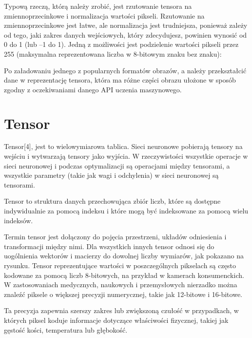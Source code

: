 \documentclass[brudnopis]{xmgr}
\begin{document}
Typową rzeczą, którą należy zrobić, jest rzutowanie tensora na zmiennoprzecinkowe i normalizacja wartości pikseli. Rzutowanie na zmiennoprzecinkowe jest łatwe, ale normalizacja jest trudniejsza, ponieważ zależy od tego, jaki zakres danych wejściowych, który zdecydujesz, powinien wynosić od 0 do 1 (lub –1 do 1). Jedną z możliwości jest podzielenie wartości pikseli przez 255 (maksymalna reprezentowana liczba w 8-bitowym znaku bez znaku):

Po załadowaniu jednego z popularnych formatów obrazów, a należy przekształcić dane w reprezentację tensora, która ma różne części obrazu ułożone w sposób zgodny z oczekiwaniami danego API uczenia maszynowego.

\section{Tensor\label{s:dsssl}}
Tensor[4], jest to wielowymiarowa tablica. Sieci neuronowe pobierają tensory na wejściu i wytwarzają tensory jako wyjścia. W rzeczywistości wszystkie operacje w sieci neuronowej i podczas optymalizacji są operacjami między tensorami, a wszystkie parametry (takie jak wagi i odchylenia) w sieci neuronowej są tensorami.

Tensor to struktura danych przechowująca zbiór liczb, które są dostępne indywidualnie za pomocą indeksu i które mogą być indeksowane za pomocą wielu indeksów.

Termin tensor jest dołączony do pojęcia przestrzeni, układów odniesienia i transformacji między nimi. Dla wszystkich innych tensor odnosi się do uogólnienia wektorów i macierzy do dowolnej liczby wymiarów, jak pokazano na rysunku.
Tensor reprezentujące wartości w poszczególnych pikselach są często kodowane za pomocą liczb 8-bitowych, na przykład w kamerach konsumenckich. W zastosowaniach medycznych, naukowych i przemysłowych nierzadko można znaleźć piksele o większej precyzji numerycznej, takie jak 12-bitowe i 16-bitowe.

 Ta precyzja zapewnia szerszy zakres lub zwiększoną czułość w przypadkach, w których piksel koduje informacje dotyczące właściwości fizycznej, takiej jak gęstość kości, temperatura lub głębokość.
 
\end{document}
